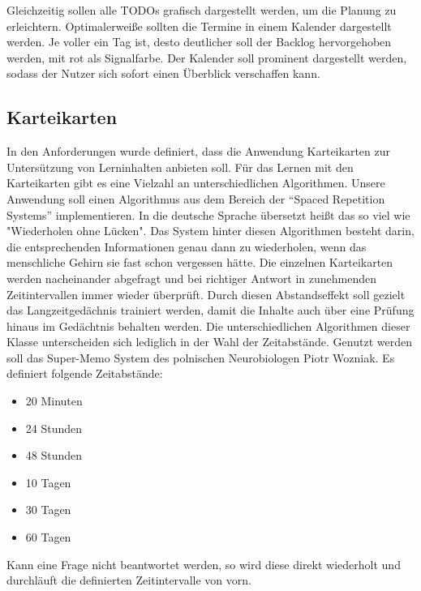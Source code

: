Gleichzeitig sollen alle TODOs grafisch dargestellt werden, um die Planung zu erleichtern.
Optimalerweiße sollten die Termine in einem Kalender dargestellt werden.
Je voller ein Tag ist, desto deutlicher soll der Backlog hervorgehoben werden, mit rot als Signalfarbe. Der Kalender soll prominent dargestellt werden, sodass der Nutzer sich sofort einen Überblick verschaffen kann. 


\subsection{Karteikarten}
In den Anforderungen wurde definiert, dass die Anwendung Karteikarten zur Untersützung von Lerninhalten anbieten soll.
Für das Lernen mit den Karteikarten gibt es eine Vielzahl an unterschiedlichen Algorithmen. Unsere Anwendung soll einen Algorithmus aus dem Bereich der \enquote{Spaced Repetition Systems} implementieren. In die deutsche Sprache übersetzt heißt das so viel wie "Wiederholen ohne Lücken". Das System hinter diesen Algorithmen besteht darin, die entsprechenden Informationen genau dann zu wiederholen, wenn das menschliche Gehirn sie fast schon vergessen hätte.\autocite[Vgl.][]{Tabibian3988} Die einzelnen Karteikarten werden nacheinander abgefragt und bei richtiger Antwort in zunehmenden Zeitintervallen immer wieder überprüft. Durch diesen Abstandseffekt soll gezielt das Langzeitgedächnis trainiert werden, damit die Inhalte auch über eine Prüfung hinaus im Gedächtnis behalten werden. Die unterschiedlichen Algorithmen dieser Klasse unterscheiden sich lediglich in der Wahl der Zeitabstände. 
Genutzt werden soll das Super-Memo System des polnischen Neurobiologen Piotr Wozniak. Es definiert folgende Zeitabstände:
\begin{itemize}
	\item 20 Minuten
	\item 24 Stunden
	\item 48 Stunden
	\item 10 Tagen
	\item 30 Tagen
	\item 60 Tagen
\end{itemize}  
Kann eine Frage nicht beantwortet werden, so wird diese direkt wiederholt und durchläuft die definierten Zeitintervalle von vorn. \autocite[Vgl.][]{BaileyuDavey}




